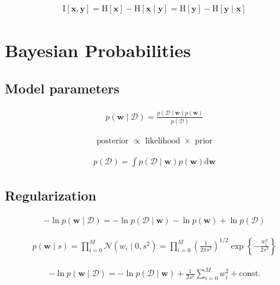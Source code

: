 \documentclass{article}
\begin{document}
\begin{align*}
\mathrm{I}[\mathbf{x}, \mathbf{y}] = \mathrm{H}[\mathbf{x}] - \mathrm{H}[\mathbf{x} \mid \mathbf{y}] = \mathrm{H}[\mathbf{y}] - \mathrm{H}[\mathbf{y} \mid \mathbf{x}]
\tag{2.110}
\end{align*}

\section{Bayesian Probabilities}

\subsection{Model parameters}

\begin{align*}
p(\mathbf{w} \mid \mathcal{D}) = \frac{p(\mathcal{D} \mid \mathbf{w}) p(\mathbf{w})}{p(\mathcal{D})}
\tag{2.111}
\end{align*}

\begin{align*}
\text{ posterior } \propto \text{ likelihood } \times \text{ prior }
\tag{2.112}
\end{align*}

\begin{align*}
p(\mathcal{D}) = \int p(\mathcal{D} \mid \mathbf{w}) p(\mathbf{w}) \mathrm{d} \mathbf{w}
\tag{2.113}
\end{align*}

\subsection{Regularization}

\begin{align*}
-\ln p(\mathbf{w} \mid \mathcal{D}) = -\ln p(\mathcal{D} \mid \mathbf{w}) - \ln p(\mathbf{w}) + \ln p(\mathcal{D})
\tag{2.114}
\end{align*}

\begin{align*}
p(\mathbf{w} \mid s) = \prod_{i=0}^{M} \mathcal{N}\left(w_{i} \mid 0, s^{2}\right) = \prod_{i=0}^{M} \left(\frac{1}{2 \pi s^{2}}\right)^{1 / 2} \exp \left\{-\frac{w_{i}^{2}}{2 s^{2}}\right\}
\tag{2.115}
\end{align*}

\begin{align*}
-\ln p(\mathbf{w} \mid \mathcal{D}) = -\ln p(\mathcal{D} \mid \mathbf{w}) + \frac{1}{2 s^{2}} \sum_{i=0}^{M} w_{i}^{2} + \text{const.}
\tag{2.116}
\end{align*}
\end{document}
